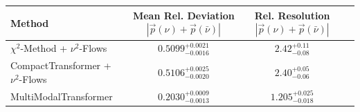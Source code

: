     \begin{tabular}{lccc}
        \toprule
        Method & Mean Rel. Deviation $|\vec{p}(\nu) + \vec{p}(\bar{\nu})|$ & Rel. Resolution $|\vec{p}(\nu) + \vec{p}(\bar{\nu})|$ \\
        \midrule
        $\chi^2$-Method + $\nu^2$-Flows & $0.5099^{+0.0021}_{-0.0016}$ & $2.42^{+0.11}_{-0.08}$ \\
        CompactTransformer + $\nu^2$-Flows & $0.5106^{+0.0025}_{-0.0020}$ & $2.40^{+0.05}_{-0.06}$ \\
        MultiModalTransformer & $0.2030^{+0.0009}_{-0.0013}$ & $1.205^{+0.025}_{-0.018}$ \\
        \bottomrule
    \end{tabular}